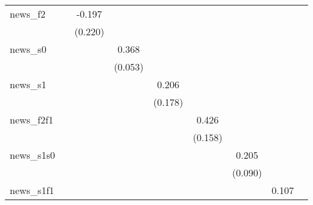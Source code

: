 {\begin{tabular}{l*{8}{c}}
news\_f2     &                     &      -0.197         &                     &                     &                     &                     &                     &                     \\
            &                     &     (0.220)         &                     &                     &                     &                     &                     &                     \\
\addlinespace
news\_s0     &                     &                     &       0.368\sym{***}&                     &                     &                     &                     &                     \\
            &                     &                     &     (0.053)         &                     &                     &                     &                     &                     \\
\addlinespace
news\_s1     &                     &                     &                     &       0.206         &                     &                     &                     &                     \\
            &                     &                     &                     &     (0.178)         &                     &                     &                     &                     \\
\addlinespace
news\_f2f1   &                     &                     &                     &                     &       0.426\sym{**} &                     &                     &                     \\
            &                     &                     &                     &                     &     (0.158)         &                     &                     &                     \\
\addlinespace
news\_s1s0   &                     &                     &                     &                     &                     &       0.205\sym{**} &                     &                     \\
            &                     &                     &                     &                     &                     &     (0.090)         &                     &                     \\
\addlinespace
news\_s1f1   &                     &                     &                     &                     &                     &                     &       0.107         &                     \\

\end{tabular}}
